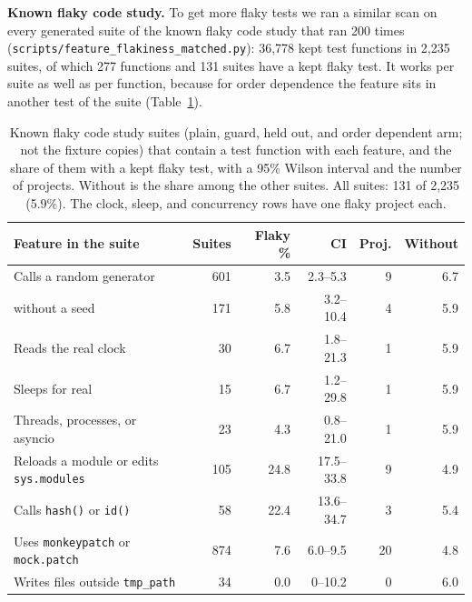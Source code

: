 \textbf{Known flaky code study.} To get more flaky tests we ran a similar scan on every generated suite of the known flaky code study that ran 200 times (\texttt{scripts/feature\_flakiness\_matched.py}): 36,778 kept test functions in 2,235 suites, of which 277 functions and 131 suites have a kept flaky test. It works per suite as well as per function, because for order dependence the feature sits in another test of the suite (Table~\ref{tab:featmatched}).

\begin{table}[htbp]
\caption{Known flaky code study suites (plain, guard, held out, and order dependent arm; not the fixture copies) that contain a test function with each feature, and the share of them with a kept flaky test, with a 95\% Wilson interval and the number of projects. Without is the share among the other suites. All suites: 131 of 2,235 (5.9\%). The clock, sleep, and concurrency rows have one flaky project each.}
\label{tab:featmatched}
\small
\setlength{\tabcolsep}{2pt}
\begin{tabularx}{\columnwidth}{>{\raggedright\arraybackslash}Xrrrrr}
\toprule
Feature in the suite & Suites & Flaky \% & CI & Proj. & Without \\
\midrule
Calls a random generator & 601 & 3.5 & 2.3--5.3 & 9 & 6.7 \\
\quad without a seed & 171 & 5.8 & 3.2--10.4 & 4 & 5.9 \\
Reads the real clock & 30 & 6.7 & 1.8--21.3 & 1 & 5.9 \\
Sleeps for real & 15 & 6.7 & 1.2--29.8 & 1 & 5.9 \\
Threads, processes, or asyncio & 23 & 4.3 & 0.8--21.0 & 1 & 5.9 \\
Reloads a module or edits \texttt{sys.modules} & 105 & 24.8 & 17.5--33.8 & 9 & 4.9 \\
Calls \texttt{hash()} or \texttt{id()} & 58 & 22.4 & 13.6--34.7 & 3 & 5.4 \\
Uses \texttt{monkeypatch} or \texttt{mock.patch} & 874 & 7.6 & 6.0--9.5 & 20 & 4.8 \\
Writes files outside \texttt{tmp\_path} & 34 & 0.0 & 0--10.2 & 0 & 6.0 \\
\bottomrule
\end{tabularx}
\end{table}

